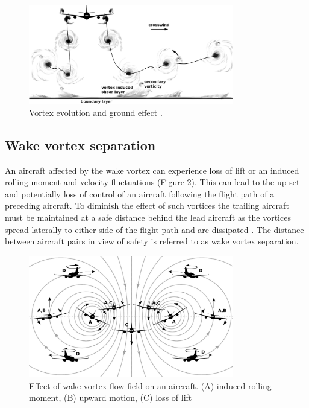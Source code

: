 \begin{figure}
    \centering
    \includegraphics[width=0.8\textwidth]{graphics/Hallock_vortex_evolution.jpg}
    \caption[Wake vortex and ground effect]{Vortex evolution and ground effect \cite[p. 29]{Hallock2018Apr}.} \label{fig:vortex_ground_effect}
\end{figure}


\subsection{Wake vortex separation}
An aircraft affected by the wake vortex can experience loss of lift or an induced rolling moment and velocity fluctuations (Figure \ref{fig:vortex_encounter}).
This can lead to the up-set and potentially loss of control of an aircraft following the flight path of a preceding aircraft.
To diminish the effect of such vortices the trailing aircraft must be maintained at a safe distance behind the lead aircraft as the vortices spread laterally to either side of the flight path and are dissipated \cite{Breitsamter2011Feb}.
The distance between aircraft pairs in view of safety is referred to as wake vortex separation. 

\begin{figure}
    \centering
    \includegraphics[width=0.8\textwidth]{graphics/reaction_in_wake.jpg}
    \caption[Wake vortex encounter]{Effect of wake vortex flow field on an aircraft. (A) induced rolling moment, (B) upward motion, (C) loss of lift  \cite[p. 33]{Hallock2018Apr}} \label{fig:vortex_encounter}
\end{figure}

